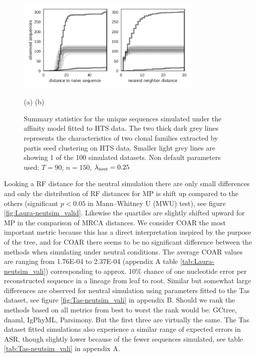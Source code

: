 \begin{figure}[!ht]
    \begin{center}
    \includegraphics[width=0.8\textwidth]{figures/Laura-affsim_Laura-data.pdf}\newline%
    \end{center}
    \vspace{-14mm} \hspace{44mm} (a) \hspace{50mm} (b)
    \caption{
        \label{fig:Laura-affsim_Laura-data}
        Summary statistics for the unique sequences simulated under the affinity model fitted to HTS data.
        The two thick dark grey lines represents the characteristics of two clonal families extracted by partis seed clustering on HTS data.
        Smaller light grey lines are showing 1 of the 100 simulated datasets.
        Non default parameters used: $T=90$, $n=150$, $\lambda_{\text{mut}}=0.25$
    }
\end{figure}


Looking a RF distance for the neutral simulation there are only small differences and only the distribution of RF distances for MP is shift up compared to the others (significant $p<0.05$ in Mann–Whitney U (MWU) test), see figure \ref{fig:Laura-neutsim_valid}.
Likewise the quartiles are slightly shifted upward for MP in the comparison of MRCA distances.
We consider COAR the most important metric because this has a direct interpretation inspired by the purpose of the tree, and for COAR there seems to be no significant difference between the methods when simulating under neutral conditions.
The average COAR values are ranging from 1.76E-04 to 2.37E-04 (appendix A table \ref{tab:Laura-neutsim_vali}) corresponding to approx. 10\% chance of one nucleotide error per reconstructed sequence in a lineage from leaf to root.
Similar but somewhat large differences are observed for neutral simulation using parameters fitted to the Tas dataset, see figure \ref{fig:Tas-neutsim_vali} in appendix B.
Should we rank the methods based on all metrics from best to worst the rank would be: GCtree, dnaml, IgPhyML, Parsimony.
But the first three are virtually the same.
The Tas dataset fitted simulations also experience a similar range of expected errors in ASR, though slightly lower because of the fewer sequences simulated, see table \ref{tab:Tas-neutsim_vali} in appendix A.

